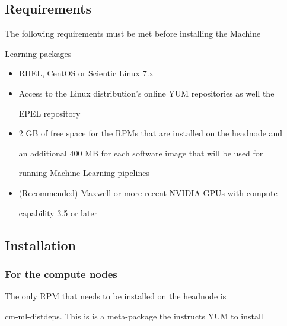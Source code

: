 \documentclass[]{article}
\providecommand{\tightlist}{%

  \setlength{\itemsep}{0pt}\setlength{\parskip}{0pt}}
\begin{document}
\subsection{Requirements}\label{requirements}



The following requirements must be met before installing the Machine

Learning packages



\begin{itemize}

\tightlist

\item

  RHEL, CentOS or Scientic Linux 7.x

\item

  Access to the Linux distribution's online YUM repositories as well the

  EPEL repository

\item

  2 GB of free space for the RPMs that are installed on the headnode and

  an additional 400 MB for each software image that will be used for

  running Machine Learning pipelines

\item

  (Recommended) Maxwell or more recent NVIDIA GPUs with compute

  capability 3.5 or later

\end{itemize}



\subsection{Installation}\label{installation}



\subsubsection{For the compute nodes}\label{for-the-compute-nodes}



The only RPM that needs to be installed on the headnode is

cm-ml-distdeps. This is is a meta-package the instructs YUM to install
\end{document}

